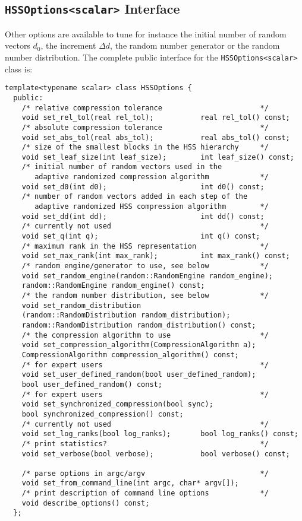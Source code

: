 \documentclass{article}
\begin{document}
\subsection{\lstinline[style=C]!HSSOptions<scalar>! Interface}
Other options are available to tune for instance the initial number of
random vectors $d_0$, the increment $\Delta d$, the random number
generator or the random number distribution. The complete public
interface for the \lstinline[style=C]!HSSOptions<scalar>! class is:
\begin{lstlisting}[style=C]
  template<typename scalar> class HSSOptions {
  public:
    /* relative compression tolerance                       */
    void set_rel_tol(real rel_tol);           real rel_tol() const;
    /* absolute compression tolerance                       */
    void set_abs_tol(real abs_tol);           real abs_tol() const;
    /* size of the smallest blocks in the HSS hierarchy     */
    void set_leaf_size(int leaf_size);        int leaf_size() const;
    /* initial number of random vectors used in the
       adaptive randomized compression algorithm            */
    void set_d0(int d0);                      int d0() const;
    /* number of random vectors added in each step of the
       adaptive randomized HSS compression algorithm        */
    void set_dd(int dd);                      int dd() const;
    /* currently not used                                   */
    void set_q(int q);                        int q() const;
    /* maximum rank in the HSS representation               */
    void set_max_rank(int max_rank);          int max_rank() const;
    /* random engine/generator to use, see below            */
    void set_random_engine(random::RandomEngine random_engine);
    random::RandomEngine random_engine() const;
    /* the random number distribution, see below            */
    void set_random_distribution
    (random::RandomDistribution random_distribution);
    random::RandomDistribution random_distribution() const;
    /* the compression algorithm to use                     */
    void set_compression_algorithm(CompressionAlgorithm a);
    CompressionAlgorithm compression_algorithm() const;
    /* for expert users                                     */
    void set_user_defined_random(bool user_defined_random);
    bool user_defined_random() const;
    /* for expert users                                     */
    void set_synchronized_compression(bool sync);
    bool synchronized_compression() const;
    /* currently not used                                   */
    void set_log_ranks(bool log_ranks);       bool log_ranks() const;
    /* print statistics?                                    */
    void set_verbose(bool verbose);           bool verbose() const;

    /* parse options in argc/argv                           */
    void set_from_command_line(int argc, char* argv[]);
    /* print description of command line options            */
    void describe_options() const;
  };
\end{lstlisting}
\end{document}
